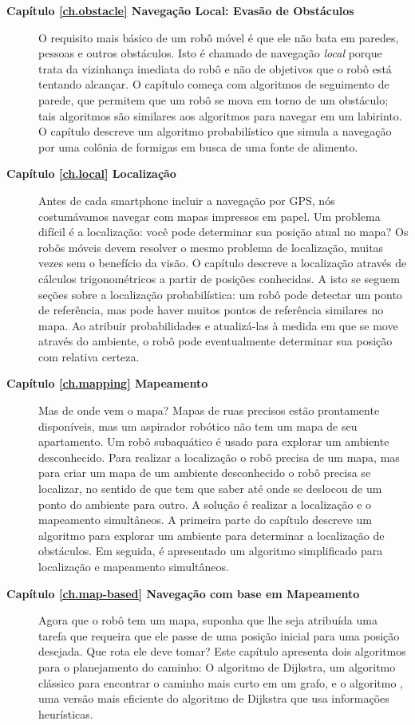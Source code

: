\begin{description}
\item [\textbf{Capítulo \ref{ch.obstacle} Navegação Local: Evasão de Obstáculos}] O requisito mais básico de um robô móvel é que ele não bata em paredes, pessoas e outros obstáculos. Isto é chamado de navegação \emph{local} porque trata da vizinhança imediata do robô e não de objetivos que o robô está tentando alcançar. O capítulo começa com algoritmos de seguimento de parede, que permitem que um robô se mova em torno de um obstáculo; tais algoritmos são similares aos algoritmos para navegar em um labirinto. O capítulo descreve um algoritmo probabilístico que simula a navegação por uma colônia de formigas em busca de uma fonte de alimento.
\item [\textbf{Capítulo \ref{ch.local} Localização}] Antes de cada smartphone incluir a navegação por GPS, nós costumávamos navegar com mapas impressos em papel. Um problema difícil é a localização: você pode determinar sua posição atual no mapa? Os robôs móveis devem resolver o mesmo problema de localização, muitas vezes sem o benefício da visão. O capítulo descreve a localização através de cálculos trigonométricos a partir de posições conhecidas. A isto se seguem seções sobre a localização probabilística: um robô pode detectar um ponto de referência, mas pode haver muitos pontos de referência similares no mapa. Ao atribuir probabilidades e atualizá-las à medida em que se move através do ambiente, o robô pode eventualmente determinar sua posição com relativa certeza.

\item [\textbf{Capítulo \ref{ch.mapping} Mapeamento}] Mas de onde vem o mapa? Mapas de ruas precisos estão prontamente disponíveis, mas um aspirador robótico não tem um mapa de seu apartamento. Um robô subaquático é usado para explorar um ambiente desconhecido. Para realizar a localização o robô precisa de um mapa, mas para criar um mapa de um ambiente desconhecido o robô precisa se localizar, no sentido de que tem que saber até onde se deslocou de um ponto do ambiente para outro. A solução é realizar a localização e o mapeamento simultâneos. A primeira parte do capítulo descreve um algoritmo para explorar um ambiente para determinar a localização de obstáculos. Em seguida, é apresentado um algoritmo simplificado para localização e mapeamento simultâneos.

\item [\textbf{Capítulo \ref{ch.map-based} Navegação com base em Mapeamento}] Agora que o robô tem um mapa, suponha que lhe seja atribuída uma tarefa que requeira que ele passe de uma posição inicial para uma posição desejada. Que rota ele deve tomar? Este capítulo apresenta dois algoritmos para o planejamento do caminho: O algoritmo de Dijkstra, um algoritmo clássico para encontrar o caminho mais curto em um grafo, e o algoritmo \astar{}, uma versão mais eficiente do algoritmo de Dijkstra que usa informações heurísticas.
\end{description}

